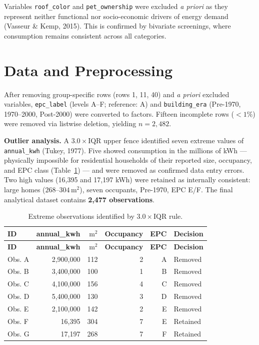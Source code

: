\documentclass[11pt, a4paper]{article}
\begin{document}
Variables \texttt{roof\_color} and \texttt{pet\_ownership} were excluded \textit{a priori} as they represent neither functional nor socio-economic drivers of energy demand (Vasseur \& Kemp, 2015). This is confirmed by bivariate screenings, where consumption remains consistent across all categories.

\section{Data and Preprocessing}\label{sec:data}

After removing group-specific rows (rows 1, 11, 40) and \textit{a priori} excluded variables, \texttt{epc\_label} (levels A--F; reference: A) and \texttt{building\_era} (Pre-1970, 1970--2000, Post-2000) were converted to factors. Fifteen incomplete rows ($<1\%$) were removed via listwise deletion, yielding $n = 2{,}482$.

\textbf{Outlier analysis.} A $3.0 \times \text{IQR}$ upper fence identified seven extreme values of \texttt{annual\_kwh} (Tukey, 1977). Five showed consumption in the millions of kWh --- physically impossible for residential households of their reported size, occupancy, and EPC class (Table~\ref{tab:outliers}) --- and were removed as confirmed data entry errors. Two high values (16,395 and 17,197 kWh) were retained as internally consistent: large homes ($268\text{--}304\,\text{m}^2$), seven occupants, Pre-1970, EPC E/F. The final analytical dataset contains \textbf{2,477 observations}.

\begin{longtable}{lrrrrl}
\caption{Extreme observations identified by $3.0 \times \text{IQR}$ rule.}\label{tab:outliers}\\
\toprule
\textbf{ID} & \textbf{annual\_kwh} & \textbf{$\text{m}^2$} & \textbf{Occupancy} & \textbf{EPC} & \textbf{Decision} \\
\midrule
\endfirsthead
\toprule
\textbf{ID} & \textbf{annual\_kwh} & \textbf{$\text{m}^2$} & \textbf{Occupancy} & \textbf{EPC} & \textbf{Decision} \\
\midrule
\endhead
\bottomrule
\endlastfoot
Obs. A & 2,900,000 & 112 & 2 & A & Removed \\
Obs. B & 3,400,000 & 100 & 1 & B & Removed \\
Obs. C & 4,100,000 & 156 & 4 & C & Removed \\
Obs. D & 5,400,000 & 130 & 3 & D & Removed \\
Obs. E & 2,100,000 & 142 & 2 & E & Removed \\
Obs. F & 16,395    & 304 & 7 & E & Retained \\
Obs. G & 17,197    & 268 & 7 & F & Retained \\
\end{longtable}
\end{document}
